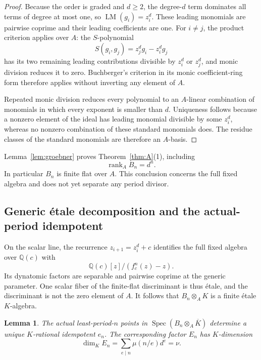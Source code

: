 \documentclass[11pt]{article}
\newtheorem{lemma}[theorem]{Lemma}
\theoremstyle{definition}
\theoremstyle{remark}
\newcommand{\Q}{\mathbb{Q}}
\newcommand{\Kbar}{\overline{K}}
\newcommand{\Spec}{\operatorname{Spec}}
\newcommand{\LM}{\operatorname{LM}}
\newcommand{\etale}{\'{e}tale}
\begin{document}
\begin{proof}
Because the order is graded and $d\geq2$, the degree-$d$ term dominates all
terms of degree at most one, so $\LM(g_i)=z_i^d$.  These leading monomials
are pairwise coprime and their leading coefficients are one.  For $i\ne j$,
the product criterion applies over $A$: the $S$-polynomial
\[
 S(g_i,g_j)=z_j^d g_i-z_i^d g_j
\]
has its two remaining leading contributions divisible by $z_i^d$ or
$z_j^d$, and monic division reduces it to zero.  Buchberger's criterion in
its monic coefficient-ring form therefore applies without inverting any
element of $A$.

Repeated monic division reduces every polynomial to an $A$-linear
combination of monomials in which every exponent is smaller than $d$.
Uniqueness follows because a nonzero element of the ideal has leading
monomial divisible by some $z_i^d$, whereas no nonzero combination of these
standard monomials does.  The residue classes of the standard monomials are
therefore an $A$-basis.
\end{proof}

Lemma~\ref{lem:groebner} proves Theorem~\ref{thm:A}(1), including
\begin{equation}\label{eq:Bn-rank}
 \operatorname{rank}_A B_n=d^n.
\end{equation}
In particular $B_n$ is finite flat over $A$.  This conclusion concerns the
full fixed algebra and does not yet separate any period divisor.

\subsection{Generic \etale{} decomposition and the actual-period idempotent}

On the scalar line, the recurrence $z_{i+1}=z_i^d+c$ identifies the full
fixed algebra over $\Q(c)$ with
\[
 \Q(c)[z]/(f_c^n(z)-z).
\]
Its dynatomic factors are separable and pairwise coprime at the generic
parameter.  One scalar fiber of the finite-flat discriminant is thus
\etale, and the discriminant is not the zero element of $A$.  It follows
that $B_n\otimes_AK$ is a finite \etale{} $K$-algebra.

\begin{lemma}\label{lem:idempotent}
The actual least-period-$n$ points in
$\Spec(B_n\otimes_A\Kbar)$ determine a unique $K$-rational idempotent $e_n$.
The corresponding factor $E_n$ has $K$-dimension
\[
 \dim_K E_n=\sum_{e\mid n}\mu(n/e)d^e=\nu.
\]
\end{lemma}
\end{document}
